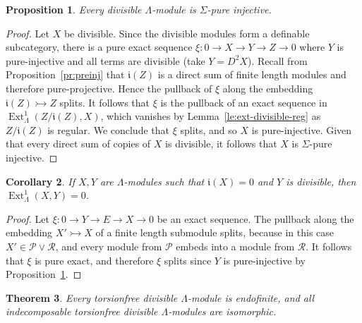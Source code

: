 \documentclass[a4paper]{amsart}
\theoremstyle{plain}
\newtheorem{thm}{Theorem}[section]
\newtheorem{prop}[thm]{Proposition}
\newtheorem{cor}[thm]{Corollary}
\theoremstyle{definition}
\theoremstyle{remark}
\numberwithin{equation}{section}
\newcommand{\Ext}{\operatorname{Ext}}
\def\P{\mathcal P}
\def\R{\mathcal R}
\newcommand{\fri}{\mathfrak i}
\def\La{\Lambda}
\def\Si{\Sigma}
\begin{document}
\begin{prop}\label{pr:divisible-pure-inj}
  Every divisible $\La$-module is $\Si$-pure injective.
\end{prop}
\begin{proof}
  Let $X$ be divisible. Since the divisible modules form a definable
  subcategory, there is a pure exact sequence
  $\xi\colon 0\to X\to Y\to Z\to 0$ where $Y$ is pure-injective and
  all terms are divisible (take $Y=D^2X$). Recall from Proposition~\ref{pr:preinj} that
  $\fri(Z)$ is a direct sum of finite length modules and therefore
  pure-projective. Hence the pullback of $\xi$ along the embedding
  $\fri(Z)\rightarrowtail Z$ splits. It follows that $\xi$ is the pullback of an
  exact sequence in $\Ext^1_\Lambda(Z/\fri(Z),X)$, which vanishes by
  Lemma~\ref{le:ext-divisible-reg} as $Z/\fri(Z)$ is
  regular. We conclude that $\xi$ splits, and so
  $X$ is pure-injective. Given that every direct sum of copies of $X$
  is divisible, it follows that $X$  is $\Si$-pure injective.
  \end{proof}

\begin{cor}\label{co:ext-divisible}%
   If $X,Y$ are $\La$-modules such that $\fri(X)=0$ and $Y$ is
   divisible, then $\Ext^1_\La(X,Y)=0$.
   \end{cor}
 \begin{proof}
   Let $\xi\colon 0\to Y\to E\to X\to 0$ be an exact sequence. The
   pullback along the embedding $X'\rightarrowtail X$ of a finite
   length submodule splits, because in this case $X'\in \P\vee\R$, and
   every module from $\P$ embeds into a module from $\R$. It follows
   that $\xi$ is pure exact, and therefore $\xi$ splits since $Y$ is
   pure-injective by Proposition~\ref{pr:divisible-pure-inj}.
 \end{proof}
 
 \begin{thm}\label{th:endofinite}
Every torsionfree divisible $\Lambda$-module is endofinite, and all indecomposable torsionfree divisible $\Lambda$-modules are isomorphic. 
\end{thm}
\end{document}
